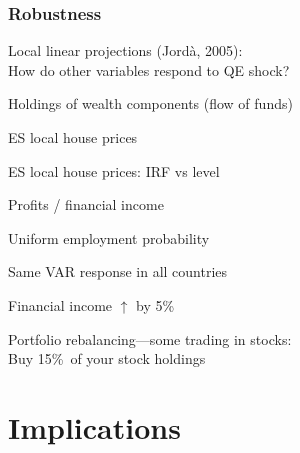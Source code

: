 \documentclass[pdflatex,aspectratio=169]{beamer}
\newcommand{\jemph}[1]{{\color{StataDarkBlue}#1}}
\begin{document}
\begin{frame}\frametitle{\bf Robustness \hypertarget{Robust}{}}

\bi
\item \jemph{Local linear projections (Jord\`a, 2005):}\\ How do other variables respond to QE shock?
\bi
\item  Holdings of wealth components (flow of funds) \hyperlink{FoF}{\beamergotobutton{}}
\item ES local house prices \hyperlink{ESlocalHP}{\beamergotobutton{}}
\item ES local house prices: IRF vs level \hyperlink{ESlocalHPlevel}{\beamergotobutton{}}
\item Profits / financial income \hyperlink{finInc}{\beamergotobutton{}}
\ei
\item Uniform employment probability \hyperlink{UniformEmpProb}{\beamergotobutton{}}
\item Same VAR response in all countries \hyperlink{SameXC}{\beamergotobutton{}}
\item Financial income $\uparrow$ by 5\% \hyperlink{FinInc}{\beamergotobutton{}}
\item Portfolio rebalancing---some trading in stocks:\\ Buy 15\%\ of your stock holdings \hyperlink{StockBoost}{\beamergotobutton{}}
\ei
\end{frame}



\section{Implications}



\begin{comment}
\begin{frame}\frametitle{\bf\normalsize Popular hypothesis: Asset purchases boost wealth inequality }
\bi
\item<1-> But what about effects of APP on house prices?
\item<2-> And what about employment effects / income inequality?
\item<2-> Little quantitative evidence in general
\begin{figure}
\begin{center}
\texttt{[image: ./figures/fAssetParticipationByIncome]}
\end{center}
\end{figure}
\ei

\end{frame}
\end{comment}
\end{document}
